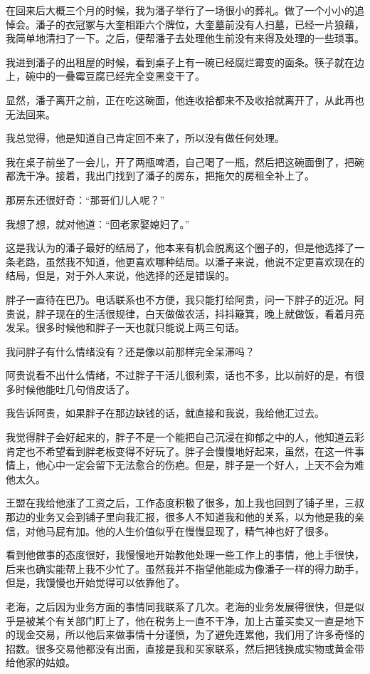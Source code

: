 在回来后大概三个月的时候，我为潘子举行了一场很小的葬礼。做了一个小小的追悼会。潘子的衣冠冢与大奎相距六个牌位，大奎墓前没有人扫墓，已经一片狼藉，我简单地清扫了一下。之后，便帮潘子去处理他生前没有来得及处理的一些琐事。

我进到潘子的出租屋的时候，看到桌子上有一碗已经腐烂霉变的面条。筷子就在边上，碗中的一叠霉豆腐已经完全变黑变干了。

显然，潘子离开之前，正在吃这碗面，他连收拾都来不及收拾就离开了，从此再也无法回来。

我总觉得，他是知道自己肯定回不来了，所以没有做任何处理。

我在桌子前坐了一会儿，开了两瓶啤酒，自己喝了一瓶，然后把这碗面倒了，把碗都洗干净。接着，我出门找到了潘子的房东，把拖欠的房租全补上了。

那房东还很好奇：“那哥们儿人呢？”

我想了想，就对他道：“回老家娶媳妇了。”

这是我认为的潘子最好的结局了，他本来有机会脱离这个圈子的，但是他选择了一条老路，虽然我不知道，他更喜欢哪种结局。以潘子来说，他说不定更喜欢现在的结局，但是，对于外人来说，他选择的还是错误的。

胖子一直待在巴乃。电话联系也不方便，我只能打给阿贵，问一下胖子的近况。阿贵说，胖子现在的生活很规律，白天做做农活，抖抖簸箕，晚上就做饭，看着月亮发呆。很多时候他和胖子一天也就只能说上两三句话。

我问胖子有什么情绪没有？还是像以前那样完全呆滞吗？

阿贵说看不出什么情绪，不过胖子干活儿很利索，话也不多，比以前好的是，有很多时候他能吐几句俏皮话了。

我告诉阿贵，如果胖子在那边缺钱的话，就直接和我说，我给他汇过去。

我觉得胖子会好起来的，胖子不是一个能把自己沉浸在抑郁之中的人，他知道云彩肯定也不希望看到胖老板变得不好玩了。胖子会慢慢地好起来，虽然，在这一件事情上，他心中一定会留下无法愈合的伤疤。但是，胖子是一个好人，上天不会为难他太久。

王盟在我给他涨了工资之后，工作态度积极了很多，加上我也回到了铺子里，三叔那边的业务又会到铺子里向我汇报，很多人不知道我和他的关系，以为他是我的亲信，对他马屁有加。他的人生价值似乎在慢慢显现了，精气神也好了很多。

看到他做事的态度很好，我慢慢地开始教他处理一些工作上的事情，他上手很快，后来也确实能帮上我不少忙了。虽然我并不指望他能成为像潘子一样的得力助手，但是，我馒慢也开始觉得可以依靠他了。

老海，之后因为业务方面的事情同我联系了几次。老海的业务发展得很快，但是似乎是被某个有关部门盯上了，他在税务上一直不干净，加上古董买卖又一直是地下的现金交易，所以他后来做事情十分谨愤，为了避免连累他，我们用了许多奇怪的招数。很多交易他都没有出面，直接是我和买家联系，然后把钱换成实物或黄金带给他家的姑娘。


